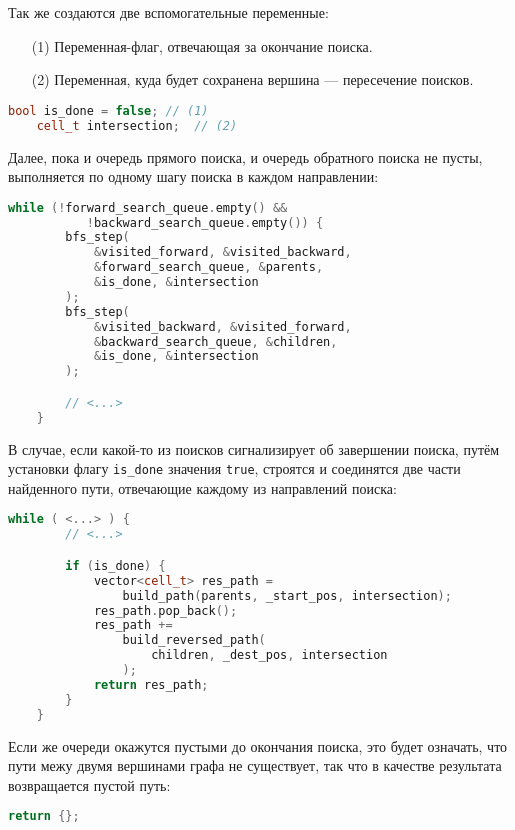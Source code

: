 \documentclass[a4paper, 12pt]{article}
\begin{document}
Так же создаются две вспомогательные переменные:
\begin{itemize}
    \item[(1)] Переменная-флаг, отвечающая за окончание поиска.
    \item[(2)] Переменная, куда будет сохранена вершина --- пересечение поисков.
\end{itemize}
\begin{lstlisting}[language=C++]
    bool is_done = false; // (1)
    cell_t intersection;  // (2)
\end{lstlisting}

Далее, пока и очередь прямого поиска, и очередь обратного поиска не пусты, выполняется по одному шагу поиска в каждом направлении:
\begin{lstlisting}[language=C++]
    while (!forward_search_queue.empty() &&
           !backward_search_queue.empty()) {
        bfs_step(
            &visited_forward, &visited_backward,
            &forward_search_queue, &parents,
            &is_done, &intersection
        );
        bfs_step(
            &visited_backward, &visited_forward,
            &backward_search_queue, &children,
            &is_done, &intersection
        );

        // <...>
    }
\end{lstlisting}

В случае, если какой-то из поисков сигнализирует об завершении поиска, путём установки флагу \verb|is_done| значения \verb|true|, строятся и соединятся две части найденного пути, отвечающие каждому из направлений поиска:
\begin{lstlisting}[language=C++]
    while ( <...> ) {
        // <...>

        if (is_done) {
            vector<cell_t> res_path =
                build_path(parents, _start_pos, intersection);
            res_path.pop_back();
            res_path +=
                build_reversed_path(
                    children, _dest_pos, intersection
                );
            return res_path;
        }
    }
\end{lstlisting}

Если же очереди окажутся пустыми до окончания поиска, это будет означать, что пути межу двумя вершинами графа не существует, так что в качестве результата возвращается пустой путь:
\begin{lstlisting}[language=C++]
    return {};
\end{lstlisting}
\end{document}
